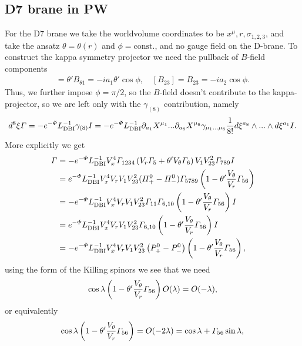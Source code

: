 \documentclass[11pt]{article}
\let\oldPhi=\Phi
\let\oldGamma=\Gamma
\let\oldPi=\Pi
\renewcommand{\Phi}{\mathnormal{\oldPhi}}
\renewcommand{\Gamma}{\mathnormal{\oldGamma}}
\renewcommand{\Pi}{\mathnormal{\oldPi}}
\newcommand{\sfrac}[2]{{\textstyle\frac{#1}{#2}}}
\newcommand{\p}{\partial}\newcommand{\quarter}{\sfrac{1}{4}}
\begin{document}
\subsection{D7 brane in PW}
For the D7 brane we take the worldvolume coordinates to be $x^\mu,r,\sigma_{1,2,3}$, and take the ansatz $\theta = \theta(r)$ and $\phi = \text{const.}$, and no gauge field on the D-brane.
To construct the kappa symmetry projector we need the pullback of $B$-field components
\begin{align}
[B_{r 1}] = \theta' B_{\theta 1} = -i a_1 \theta' \cos\phi ,\quad
[B_{2 3}] = B_{2 3} = - i a_2 \cos\phi.
\end{align}
Thus, we further impose $\phi = \pi/2$, so the $B$-field doesn't contribute to the kappa-projector, so we are left only with the $\gamma_{(8)}$ contribution, namely
\begin{align}
d^{8} \xi \Gamma = - e^{-\Phi} L_{\text{DBI}}^{-1} \gamma_{(8)}I
=- e^{-\Phi} L_{\text{DBI}}^{-1} \p_{a_1} X^{\mu_1}...\p_{a_8} X^{\mu_8}\gamma_{\mu_1...\mu_8}\frac{1}{8 !}d\xi^{a_8}\wedge ... \wedge d\xi^{a_1}I.
\end{align}
More explicitly we get
\begin{align}
\Gamma & = - e^{-\Phi} L_{\text{DBI}}^{-1} V_x^4\Gamma_{1234}\left(V_r \Gamma_5 + \theta' V_\theta \Gamma_6 \right)V_1 V_{23}^2\Gamma_{789}I\nonumber\\
& =  e^{-\Phi} L_{\text{DBI}}^{-1} V_x^4 V_r V_1 V_{23}^2 (\Pi^0_+-\Pi^0_-)\Gamma_{5789}\left(1  - \theta' \frac{V_\theta}{V_r} \Gamma_{56} \right)\nonumber\\
& =  - e^{-\Phi} L_{\text{DBI}}^{-1} V_x^4 V_r V_1 V_{23}^2 \Gamma_{11}\Gamma_{6,10}\left(1  - \theta' \frac{V_\theta}{V_r} \Gamma_{56} \right)I\nonumber\\
& =  e^{-\Phi} L_{\text{DBI}}^{-1} V_x^4 V_r V_1 V_{23}^2 \Gamma_{6,10}\left(1  - \theta' \frac{V_\theta}{V_r} \Gamma_{56} \right) I \nonumber\\
& =  - e^{-\Phi} L_{\text{DBI}}^{-1} V_x^4 V_r V_1 V_{23}^2 \left(P^0_+ - P^0_-\right) \left(1  - \theta' \frac{V_\theta}{V_r} \Gamma_{56} \right),
\end{align}
using the form of the Killing spinors we see that we need
\begin{align}
\cos\lambda \left(1  - \theta' \frac{V_\theta}{V_r} \Gamma_{56} \right)O(\lambda) = O(-\lambda),
\end{align}
or equivalently
\begin{align}
\cos\lambda \left(1  - \theta' \frac{V_\theta}{V_r} \Gamma_{56} \right)= O(-2\lambda) = \cos\lambda + \Gamma_{56}\sin\lambda,
\end{align}
\end{document}
